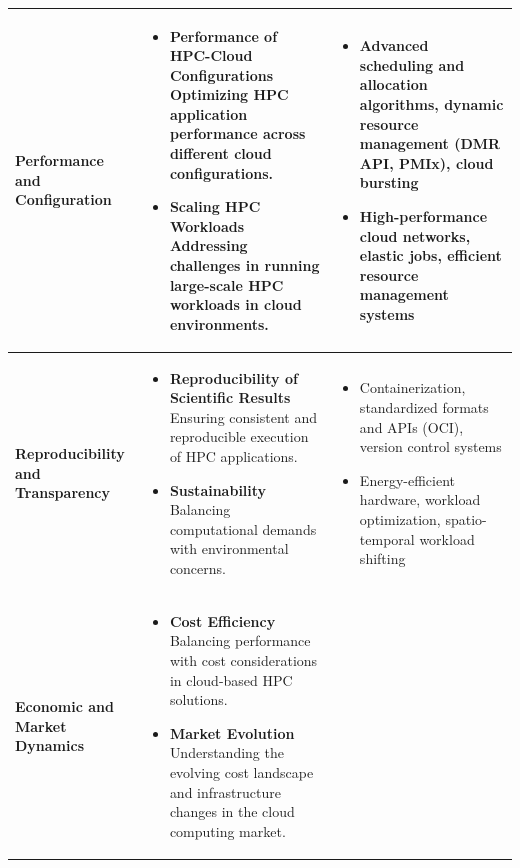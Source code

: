 \begin{table}[ht]
{\begin{tabularx}{\textwidth}{>{\raggedright\arraybackslash}p{4.5cm} >{\raggedright\arraybackslash}X >{\raggedright\arraybackslash}X}
    \midrule
    \textbf{Performance and Configuration} &
    \begin{itemize}[label={\rule[0.1ex]{0.8ex}{0.8ex}}]
    \item \textbf{Performance of HPC-Cloud Configurations} Optimizing HPC application performance across different cloud configurations.
    \item \textbf{Scaling HPC Workloads} Addressing challenges in running large-scale HPC workloads in cloud environments.
    \end{itemize} &
    \begin{itemize}[label={\rule[0.1ex]{0.8ex}{0.8ex}}]
    \item Advanced scheduling and allocation algorithms, dynamic resource management (DMR API, PMIx), cloud bursting\newline
    \item High-performance cloud networks, elastic jobs, efficient resource management systems
    \end{itemize} \\
    \midrule
    \textbf{Reproducibility and Transparency} &
    \begin{itemize}[label={\rule[0.1ex]{0.8ex}{0.8ex}}]
    \item \textbf{Reproducibility of Scientific Results} Ensuring consistent and reproducible execution of HPC applications.
    \item \textbf{Sustainability} Balancing computational demands with environmental concerns.
    \end{itemize} &
    \begin{itemize}[label={\rule[0.1ex]{0.8ex}{0.8ex}}]
    \item Containerization, standardized formats and APIs (OCI), version control systems\newline
    \item Energy-efficient hardware, workload optimization, spatio-temporal workload shifting
    \end{itemize} \\
    \midrule
    \textbf{Economic and Market Dynamics} &
    \begin{itemize}[label={\rule[0.1ex]{0.8ex}{0.8ex}}]
    \item \textbf{Cost Efficiency} Balancing performance with cost considerations in cloud-based HPC solutions.
    \item \textbf{Market Evolution} Understanding the evolving cost landscape and infrastructure changes in the cloud computing market.
    \end{itemize} &

\end{tabularx}}
\end{table}
